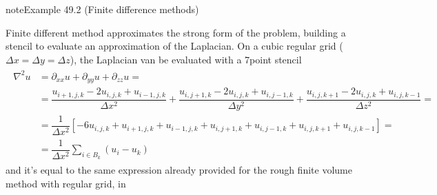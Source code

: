 \documentclass[letterpaper,10pt,english]{jupyterBook}
\begin{document}
\begin{sphinxadmonition}{note}{Example 49.2 (Finite difference methods)}



\sphinxAtStartPar
Finite different method approximates the strong form of the problem, building a stencil to evaluate an approximation of the Laplacian. On a cubic regular grid (\(\Delta x = \Delta y = \Delta z\)), the Laplacian van be evaluated with a 7\sphinxhyphen{}point stencil
\begin{equation*}
\begin{split}\begin{aligned}
  \nabla^2 u
  & = \partial_{xx} u + \partial_{yy} u + \partial_{zz} u = \\
  & = \dfrac{u_{i+1,j,k} - 2 u_{i,j,k} + u_{i-1,j,k}}{\Delta x^2} + \dfrac{u_{i,j+1,k} - 2 u_{i,j,k} + u_{i,j-1,k}}{\Delta y^2} + \dfrac{u_{i,j,k+1} - 2 u_{i,j,k} + u_{i,j,k-1}}{\Delta z^2} =  \\
  & = \dfrac{1}{\Delta x^2} \left[ - 6 u_{i,j,k} + u_{i+1,j,k} + u_{i-1,j,k} + u_{i,j+1,k} + u_{i,j-1,k} + u_{i,j,k+1} + u_{i,j,k-1} \right] = \\
  & = \dfrac{1}{\Delta x^2} \sum_{i \in B_k} (u_i - u_k)
\end{aligned}\end{split}
\end{equation*}
\sphinxAtStartPar
and it’s equal to the same expression already provided for the rough finite volume method with regular grid, in {\hyperref[\detokenize{ch/pde/numerics:pde:ex:fvm}]{}}
\end{sphinxadmonition}
\end{document}

